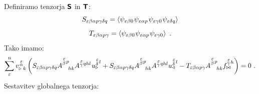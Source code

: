 Definiramo tenzorja $\bm{\mathsf{S}}$ in $\bm{\mathsf{T}}$:
\begin{equation}
   S_{\varepsilon \beta \alpha p \gamma \delta q} = \left\langle   \psi_{ \varepsilon \beta 0} \mkern1mu    \psi_{\varepsilon \alpha p} \mkern1mu    \psi_{\varepsilon \gamma 0} \mkern1mu    \psi_{\varepsilon \delta q}   \right\rangle
\end{equation}
\begin{equation}
   T_{\varepsilon \beta \alpha p \gamma} = \left\langle \psi_{ \varepsilon \beta 0} \mkern1mu    \psi_{\varepsilon \alpha p} \mkern1mu    \psi_{\varepsilon \gamma 0}    \right\rangle \ .
\end{equation}
Tako imamo:
\begin{equation}
   \sum^n_\varepsilon v^{\mkern 2mu \substack{\varepsilon \\[-0.5mm] \alpha \\[-0.2mm]}}_{\triangleright \mkern5mu k} \left(
   S_{\varepsilon \beta \alpha p \gamma \delta q}    A^{\substack{\mkern2mu \varepsilon \\[0.15mm] \beta} \mkern2mu p}_{\mkern19mu hk}    A^{\substack{\mkern2mu \varepsilon \\[-0.4mm] \gamma} \mkern2mu qhl} \mkern1mu     u^{\substack{\mkern2mu \varepsilon \\[0.2mm] \delta} \mkern2mu l}_\triangleright
   +
   S_{\varepsilon \beta \alpha p \gamma \delta q}    A^{\substack{\mkern2mu \varepsilon \\[0.15mm] \beta} \mkern2mu p}_{\mkern19mu hk}    A^{\substack{\mkern2mu \varepsilon \\[-0.4mm] \gamma} \mkern2mu qhl}    u^{\substack{\mkern2mu \varepsilon \\[0.2mm] \delta} \mkern2mu l}_\triangleleft
   -
   T_{\varepsilon \beta \alpha p \gamma}    A^{\substack{\mkern2mu \varepsilon \\[0.15mm] \beta} \mkern2mu p}_{\mkern19mu hk}    f^{\substack{\mkern2mu \varepsilon \\[-0.4mm] \gamma} \mkern2mu h}_{\bowtie}
   \right) = 0 \ .
\end{equation}
Sestavitev globalnega tenzorja:
